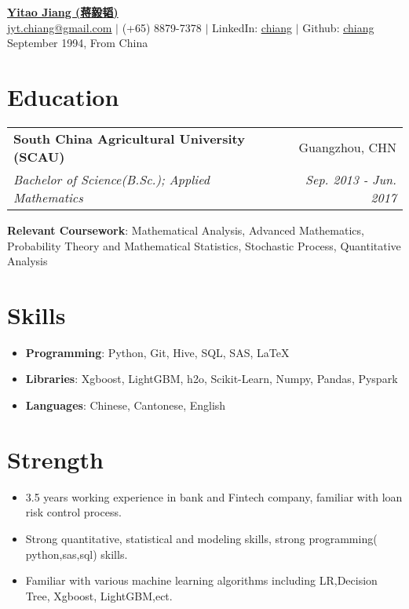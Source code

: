 \documentclass[letterpaper,10pt]{article}
\makeatletter
\newcommand{\resumeItemNoBullet}[2]{
  \item[]\small{
    \hspace{-9pt}\textbf{#1}{: #2 \vspace{-6pt}}
  }
}
\newcommand{\resumeSubheading}[4]{
  \vspace{-1pt}\item[]
  \begin{tabular*}{0.98\textwidth}{l@{\extracolsep{\fill}}r}
      \hspace{-10pt}\textbf{#1} & #2 \\
      \hspace{-10pt}\textit{\small#3} & \textit{\small #4} \\
    \end{tabular*}\vspace{-5pt}
}
\newcommand{\resumeSubHeadingListStart}{\begin{itemize}[leftmargin=*]}
\newcommand{\resumeSubHeadingListEnd}{\end{itemize}}
\newcommand{\shorterSection}[1]{\vspace{-10pt}\section{#1}}
\makeatother
\begin{document}
\begin{CJK*}{UTF8}{gkai}

\fancyfoot[C]{} 

\begin{center}
  \small \textbf{\href{chiang233.github.io}{\huge Yitao Jiang (蒋毅韬)}} \\  \href{jyt.chiang@gmail.com}{\color{blue}\underline{jyt.chiang@gmail.com}} $\vert$
  (+65) 8879-7378 $\vert$
  LinkedIn: \href{https://www.linkedin.com/in/chiang1049/}{\color{blue}\underline{chiang}} $\vert$
  Github: \href{https://github.com/chiang233}{\color{blue}\underline{chiang}} \\
  \small September 1994, From China
\end{center}

\hspace*{\fill} 

\shorterSection{Education}
  \resumeSubHeadingListStart
    \resumeSubheading
      {South China Agricultural University (SCAU)}{Guangzhou, CHN}
      {Bachelor of Science(B.Sc.);  Applied Mathematics}{Sep. 2013 - Jun. 2017}{
      \resumeItemNoBullet{Relevant Coursework}{Mathematical Analysis, Advanced Mathematics, Probability Theory and Mathematical Statistics, Stochastic Process, Quantitative Analysis}
    }

  \resumeSubHeadingListEnd
  \hspace*{\fill} 

\shorterSection{Skills}
  \resumeSubHeadingListStart
  \small
    \item{
     \textbf{Programming}{: Python, Git, Hive, SQL, SAS, LaTeX}
    }
    \vspace{-5pt}
    \item{
     \textbf{Libraries}{: Xgboost, LightGBM, h2o, Scikit-Learn, Numpy, Pandas, Pyspark}
    }
    \vspace{-5pt}
    \item{
     \textbf{Languages}{: Chinese, Cantonese, English}
    }
\resumeSubHeadingListEnd
  \hspace*{\fill} 

\shorterSection{Strength}
  \resumeSubHeadingListStart
  \small
    \item{
     \textbf{}{3.5 years working experience in bank and Fintech company, familiar with loan risk control process.}
    }
    \vspace{-5pt}
    \item{
     \textbf{}{Strong quantitative, statistical and modeling skills, strong programming( python,sas,sql) skills.}
    }
    \vspace{-5pt}
    \item{
     \textbf{}{Familiar with various machine learning algorithms including LR,Decision Tree, Xgboost, LightGBM,ect.}
    }
\resumeSubHeadingListEnd
  \hspace*{\fill} 


\end{CJK*}
\end{document}
